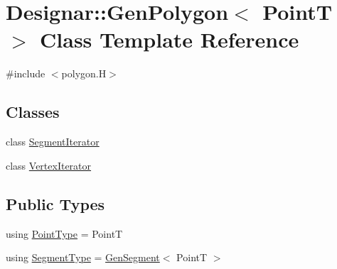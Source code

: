 \hypertarget{class_designar_1_1_gen_polygon}{}\section{Designar\+:\+:Gen\+Polygon$<$ PointT $>$ Class Template Reference}
\label{class_designar_1_1_gen_polygon}


{\ttfamily \#include $<$polygon.\+H$>$}

\subsection*{Classes}
\begin{DoxyCompactItemize}
\item 
class \hyperlink{class_designar_1_1_gen_polygon_1_1_segment_iterator}{Segment\+Iterator}
\item 
class \hyperlink{class_designar_1_1_gen_polygon_1_1_vertex_iterator}{Vertex\+Iterator}
\end{DoxyCompactItemize}
\subsection*{Public Types}
\begin{DoxyCompactItemize}
\item 
using \hyperlink{class_designar_1_1_gen_polygon_a257735320e85cb672973f88f01625632}{Point\+Type} = PointT
\item 
using \hyperlink{class_designar_1_1_gen_polygon_a06fe54118b31269c3fc76cc9b5e55654}{Segment\+Type} = \hyperlink{class_designar_1_1_gen_segment}{Gen\+Segment}$<$ PointT $>$
\end{DoxyCompactItemize}
